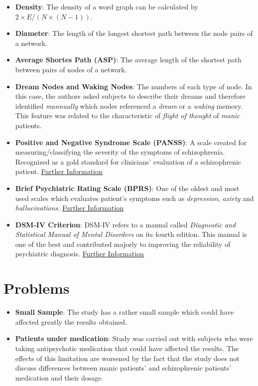 \documentclass{Paper_Summary}
\begin{document}
\begin{itemize}
        \item \textbf{Density}: The density of a word graph can be calculated by \(2 \times E / (N \times (N - 1))\).
        \item \textbf{Diameter}: The length of the longest shortest path between the node pairs of a network.
        \item \textbf{Average Shortes Path (ASP)}: The average length of the shortest path between pairs of nodes of a network.
        \item \textbf{Dream Nodes and Waking Nodes}: The numbers of each type of node. In this case, the authors asked subjects to describe their dreams and therefore identified \emph{mannually} which nodes referenced a \emph{dream} or a \emph{waking} memory. This feature was related to the characteristic of \emph{flight of thought} of \emph{manic} patients. 
        \item \textbf{Positive and Negative Syndrome Scale (PANSS)}: A scale created for measuring/classifying the severity of the symptoms of schizophrenia. Recognized as a gold standard for clinicians' evaluation of a schizophrenic patient. \href{https://en.wikipedia.org/wiki/Positive_and_Negative_Syndrome_Scale}{Further Information}
        \item \textbf{Brief Psychiatric Rating Scale (BPRS)}: One of the oldest and most used scales which evaluates patient's symptoms such as \emph{depression}, \emph{axiety} and \emph{hallucinations}. \href{https://en.wikipedia.org/wiki/Brief_Psychiatric_Rating_Scale}{Further Information}
        \item \textbf{DSM-IV Criterion}: DSM-IV refers to a manual called \emph{Diagnostic and Statistical Manual of Mental Disorders} on its fourth edition. This manual is one of the best and contributed majorly to improving the reliability of psychiatric diagnosis. \href{https://en.wikipedia.org/wiki/Diagnostic_and_Statistical_Manual_of_Mental_Disorders#DSM-IV_(1994)}{Further Information}
    
    \end{itemize}

\section{Problems}
    \begin{itemize}
        \item \textbf{Small Sample}: The study has a rather small sample which could have affected greatly the results obtained.
        \item \textbf{Patients under medication}: Study was carried out with subjects who were taking antipsychotic medication that could have affected the results. The effects of this limitation are worsened by the fact that the study does not discuss differences between manic patients' and schizophrenic patients' medication and their dosage.
    \end{itemize}
\end{document}
